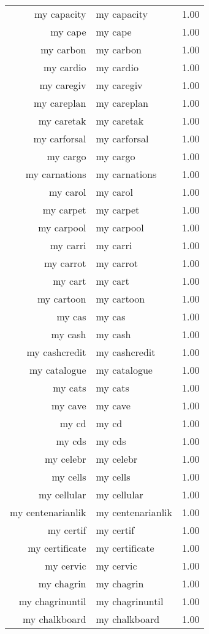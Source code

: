 \begin{table}[ht]
\begin{tabular}{rlr}
  my capacity & my capacity & 1.00 \\ 
  my cape & my cape & 1.00 \\ 
  my carbon & my carbon & 1.00 \\ 
  my cardio & my cardio & 1.00 \\ 
  my caregiv & my caregiv & 1.00 \\ 
  my careplan & my careplan & 1.00 \\ 
  my caretak & my caretak & 1.00 \\ 
  my carforsal & my carforsal & 1.00 \\ 
  my cargo & my cargo & 1.00 \\ 
  my carnations & my carnations & 1.00 \\ 
  my carol & my carol & 1.00 \\ 
  my carpet & my carpet & 1.00 \\ 
  my carpool & my carpool & 1.00 \\ 
  my carri & my carri & 1.00 \\ 
  my carrot & my carrot & 1.00 \\ 
  my cart & my cart & 1.00 \\ 
  my cartoon & my cartoon & 1.00 \\ 
  my cas & my cas & 1.00 \\ 
  my cash & my cash & 1.00 \\ 
  my cashcredit & my cashcredit & 1.00 \\ 
  my catalogue & my catalogue & 1.00 \\ 
  my cats & my cats & 1.00 \\ 
  my cave & my cave & 1.00 \\ 
  my cd & my cd & 1.00 \\ 
  my cds & my cds & 1.00 \\ 
  my celebr & my celebr & 1.00 \\ 
  my cells & my cells & 1.00 \\ 
  my cellular & my cellular & 1.00 \\ 
  my centenarianlik & my centenarianlik & 1.00 \\ 
  my certif & my certif & 1.00 \\ 
  my certificate & my certificate & 1.00 \\ 
  my cervic & my cervic & 1.00 \\ 
  my chagrin & my chagrin & 1.00 \\ 
  my chagrinuntil & my chagrinuntil & 1.00 \\ 
  my chalkboard & my chalkboard & 1.00 \\ 

\end{tabular}
\end{table}

